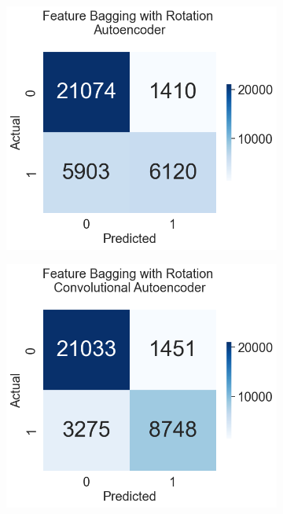 \documentclass[a4paper,12pt]{report}
\theoremstyle{definitionNODot}
\begin{document}
	\begin{figure}[H]
		\centering
		\begin{subfigure}[b]{0.35\textwidth}
			\centering
			\includegraphics[width=\textwidth]{anomaly_by_ensemble_ensemble_rotation_autoencoder.png}
			
			\label{fig:anomaly_by_ensemble_ensemble_rotation_autoencoder}
		\end{subfigure}
		\hfil
		\begin{subfigure}[b]{0.35\textwidth}
			\centering
			\includegraphics[width=\textwidth]{anomaly_by_ensemble_ensemble_rotation_conv_ae.png}
			

\end{subfigure}
\end{figure}
\end{document}
